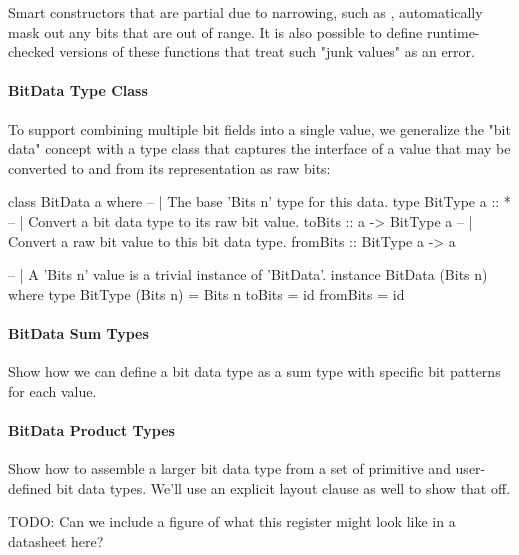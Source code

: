 Smart constructors that are partial due to narrowing,
such as , automatically mask out any bits that are
out of range. It is also possible to define runtime-checked versions
of these functions that treat such "junk values" as an error.

\paragraph{BitData Type Class}
To support combining multiple bit fields into a single value, we
generalize the "bit data" concept with a type class 
that captures the interface of a value that may be converted to
and from its representation as raw bits:

\begin{code}
class BitData a where
  -- | The base 'Bits n' type for this data.
  type BitType a :: *
  -- | Convert a bit data type to its raw bit value.
  toBits :: a -> BitType a
  -- | Convert a raw bit value to this bit data type.
  fromBits :: BitType a -> a

-- | A 'Bits n' value is a trivial instance of 'BitData'.
instance BitData (Bits n) where
  type BitType (Bits n) = Bits n
  toBits   = id
  fromBits = id
\end{code}

\paragraph{BitData Sum Types}
Show how we can define a bit data type as a sum type with specific
bit patterns for each value.

\begin{code}
[ivory|
  bitdata BaudRate :: Bits 2
    = baud_9600    as 0b00
    | baud_19200   as 0b01
    | baud_38400   as 0b10
    -- bit pattern 0b11 is invalid
|]
\end{code}

\paragraph{BitData Product Types}
Show how to assemble a larger bit data type from a set of primitive
and user-defined bit data types.  We'll use an explicit layout clause
as well to show that off.

TODO: Can we include a figure of what this register might look like
in a datasheet here?


